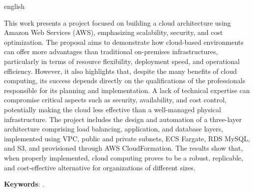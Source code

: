 %
%
%

\setlength{\absparsep}{18pt}
\begin{resumo}[Abstract]
\begin{otherlanguage*}{english}

This work presents a project focused on building a cloud architecture using Amazon Web Services (AWS), emphasizing scalability, security, and cost optimization. The proposal aims to demonstrate how cloud-based environments can offer more advantages than traditional on-premises infrastructures, particularly in terms of resource flexibility, deployment speed, and operational efficiency. However, it also highlights that, despite the many benefits of cloud computing, its success depends directly on the qualifications of the professionals responsible for its planning and implementation. A lack of technical expertise can compromise critical aspects such as security, availability, and cost control, potentially making the cloud less effective than a well-managed physical infrastructure. The project includes the design and automation of a three-layer architecture comprising load balancing, application, and database layers, implemented using VPC, public and private subnets, ECS Fargate, RDS MySQL, and S3, and provisioned through AWS CloudFormation. The results show that, when properly implemented, cloud computing proves to be a robust, replicable, and cost-effective alternative for organizations of different sizes.

\textbf{Keywords}: \imprimirkeywords.
\end{otherlanguage*}
\end{resumo}

